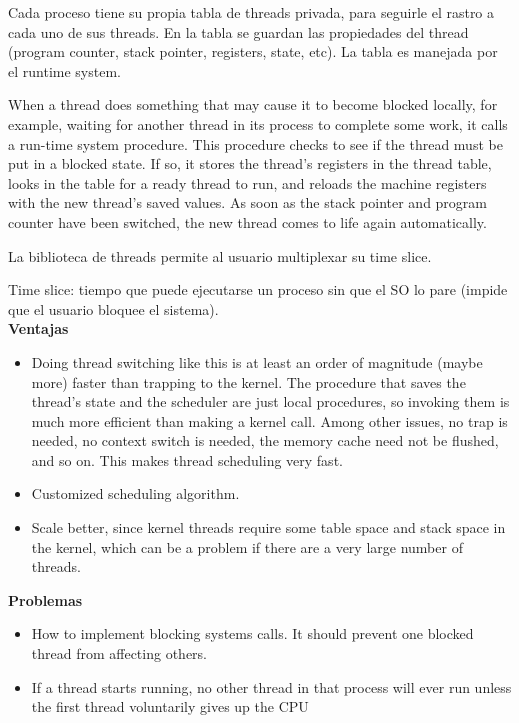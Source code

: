 \documentclass[a4paper, twoside]{article}
\begin{document}
Cada proceso tiene su propia tabla de threads privada, para seguirle el rastro a cada uno de sus threads. En la tabla se guardan las propiedades del thread (program counter, stack pointer, registers, state, etc). La tabla es manejada por el runtime system.

When a thread does something that may cause it to become blocked locally, for example, waiting for another thread in its process to complete some work, it calls a run-time system procedure. This procedure checks to see if the thread must be put in a blocked state. If so, it stores the thread’s registers in the thread table, looks in the table for a ready thread to run, and reloads the machine registers with the new thread’s saved values. As soon as the stack pointer and program counter have been switched, the new thread comes to life again automatically.

La biblioteca de threads permite al usuario multiplexar su time slice.

Time slice: tiempo que puede ejecutarse un proceso sin que el SO lo pare (impide que el usuario bloquee el sistema).\\

\textbf{Ventajas}
\begin{itemize}
	\item Doing thread switching like this is at least an order of magnitude (maybe more) faster than trapping to the kernel. The procedure that saves the thread’s state and the scheduler are just local procedures, so invoking them is much more efficient than making a kernel call. Among other issues, no trap is needed, no context switch is needed, the memory cache need not be flushed, and so on. This makes thread scheduling very fast.
	\item Customized scheduling algorithm.
	\item Scale better, since kernel threads require some table space and stack space in the kernel, which can be a problem if there are a very large number of threads.
\end{itemize}

\textbf{Problemas}
\begin{itemize}
	\item How to implement blocking systems calls. It should prevent one blocked thread from affecting others.
	\item If a thread starts running, no other thread in that process will ever run unless the first thread voluntarily gives up the CPU
\end{itemize}
\end{document}
